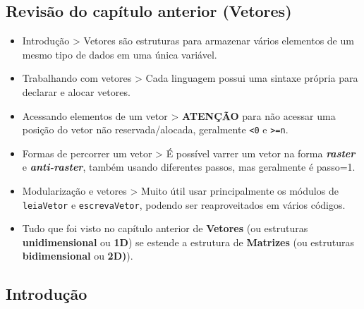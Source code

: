 \documentclass[12pt,a4paper]{article}
\begin{document}
    \hypertarget{revisuxe3o-do-capuxedtulo-anterior-vetores}{%
\subsection{Revisão do capítulo anterior
(Vetores)}\label{revisuxe3o-do-capuxedtulo-anterior-vetores}}

    \begin{itemize}
\item
  Introdução \textgreater{} Vetores são estruturas para armazenar vários
  elementos de um mesmo tipo de dados em uma única variável.
\item
  Trabalhando com vetores \textgreater{} Cada linguagem possui uma
  sintaxe própria para declarar e alocar vetores.
\item
  Acessando elementos de um vetor \textgreater{} \textbf{ATENÇÃO} para
  não acessar uma posição do vetor não reservada/alocada, geralmente
  \texttt{\textless{}0} e \texttt{\textgreater{}=n}.
\item
  Formas de percorrer um vetor \textgreater{} É possível varrer um vetor
  na forma \textbf{\emph{raster}} e \textbf{\emph{anti-raster}}, também
  usando diferentes passos, mas geralmente é passo=1.
\item
  Modularização e vetores \textgreater{} Muito útil usar principalmente
  os módulos de \texttt{leiaVetor} e \texttt{escrevaVetor}, podendo ser
  reaproveitados em vários códigos.
\item
  Tudo que foi visto no capítulo anterior de \textbf{Vetores} (ou
  estruturas \textbf{unidimensional} ou \textbf{1D}) se estende a
  estrutura de \textbf{Matrizes} (ou estruturas \textbf{bidimensional}
  ou \textbf{2D)}).
\end{itemize}

    \hypertarget{introduuxe7uxe3o}{%
\subsection{Introdução}\label{introduuxe7uxe3o}}
\end{document}
